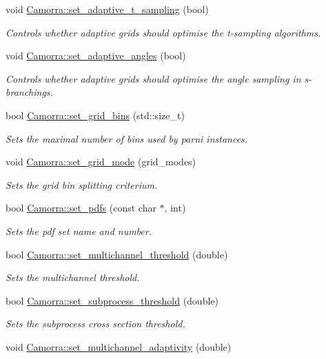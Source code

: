 \begin{DoxyCompactItemize}
void \hyperlink{a00800_ad5867bcc4ef7653a624ca13b33d1c691}{Camorra::set\_\-adaptive\_\-t\_\-sampling} (bool)
\begin{DoxyCompactList}\small\item\em Controls whether adaptive grids should optimise the t-\/sampling algorithms. \end{DoxyCompactList}\item 
void \hyperlink{a00800_a866e5cc645680018fab0fdcf72207c75}{Camorra::set\_\-adaptive\_\-angles} (bool)
\begin{DoxyCompactList}\small\item\em Controls whether adaptive grids should optimise the angle sampling in s-\/branchings. \end{DoxyCompactList}\item 
bool \hyperlink{a00800_a6d2bc8b8821a29006938082d6b6bef2d}{Camorra::set\_\-grid\_\-bins} (std::size\_\-t)
\begin{DoxyCompactList}\small\item\em Sets the maximal number of bins used by parni instances. \end{DoxyCompactList}\item 
\hypertarget{a00800_a7e1437ec1a247b7c32bd4923efabf6b6}{
void \hyperlink{a00800_a7e1437ec1a247b7c32bd4923efabf6b6}{Camorra::set\_\-grid\_\-mode} (grid\_\-modes)}
\label{a00800_a7e1437ec1a247b7c32bd4923efabf6b6}

\begin{DoxyCompactList}\small\item\em Sets the grid bin splitting criterium. \end{DoxyCompactList}\item 
bool \hyperlink{a00800_ac368b117d85d0b8799272b483b14c791}{Camorra::set\_\-pdfs} (const char $\ast$, int)
\begin{DoxyCompactList}\small\item\em Sets the pdf set name and number. \end{DoxyCompactList}\item 
bool \hyperlink{a00800_a3d412d1902455f35c2fbd020ed8651f5}{Camorra::set\_\-multichannel\_\-threshold} (double)
\begin{DoxyCompactList}\small\item\em Sets the multichannel threshold. \end{DoxyCompactList}\item 
bool \hyperlink{a00800_a2142e469e0d4ae0c098ecc1c5c18ed9e}{Camorra::set\_\-subprocess\_\-threshold} (double)
\begin{DoxyCompactList}\small\item\em Sets the subprocess cross section threshold. \end{DoxyCompactList}\item 
\hypertarget{a00800_a2615bb2dd06f477c200bbc06bd0afc66}{
void \hyperlink{a00800_a2615bb2dd06f477c200bbc06bd0afc66}{Camorra::set\_\-multichannel\_\-adaptivity} (double)}
\label{a00800_a2615bb2dd06f477c200bbc06bd0afc66}


\end{DoxyCompactItemize}
